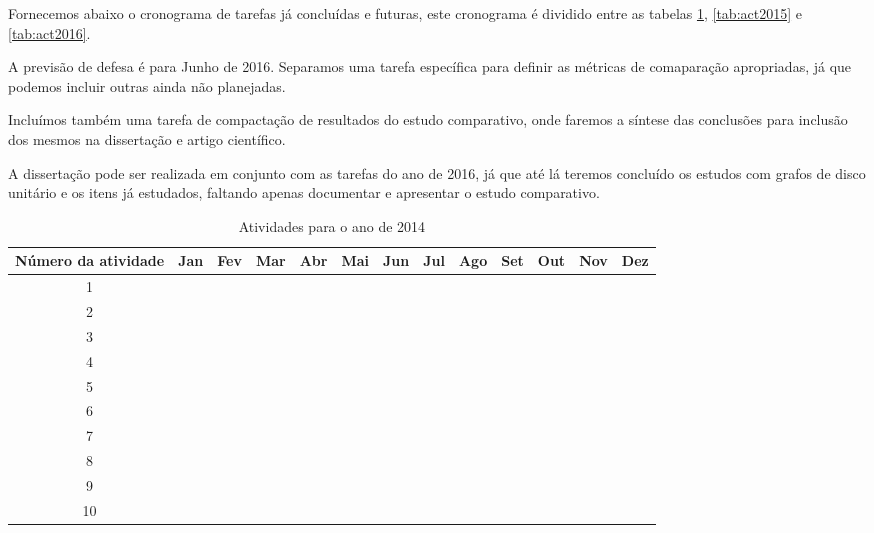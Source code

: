 Fornecemos abaixo o cronograma de tarefas já concluídas e futuras, este cronograma é dividido entre as tabelas \ref{tab:act2014}, \ref{tab:act2015} e \ref{tab:act2016}.

A previsão de defesa é para Junho de 2016. Separamos uma tarefa específica para definir as métricas de comaparação apropriadas, já que podemos incluir outras ainda não planejadas.

Incluímos também uma tarefa de compactação de resultados do estudo comparativo, onde faremos a síntese das conclusões para inclusão dos mesmos na dissertação e artigo científico.

A dissertação pode ser realizada em conjunto com as tarefas do ano de 2016, já que até lá teremos concluído os estudos com grafos de disco unitário e os itens já estudados, faltando apenas documentar e apresentar o estudo comparativo.

\begin{table}[]
\centering
\caption{Atividades para o ano de 2014}
\label{tab:act2014}
\begin{tabular}{|c|l|l|l|l|l|l|l|l|l|l|l|l|}
\hline
Número da atividade & Jan &  Fev & Mar & Abr & Mai & Jun & Jul & Ago & Set & Out & Nov & Dez \\ \hline
1& & \cellcolor[HTML]{343434}   & \cellcolor[HTML]{343434}  & \cellcolor[HTML]{343434} & \cellcolor[HTML]{343434}  & \cellcolor[HTML]{343434} & \cellcolor[HTML]{343434} &  \cellcolor[HTML]{343434} & \cellcolor[HTML]{343434} & \cellcolor[HTML]{343434} & \cellcolor[HTML]{343434} & \cellcolor[HTML]{343434}  \\ \hline
2& & \cellcolor[HTML]{343434}  & \cellcolor[HTML]{343434}   & \cellcolor[HTML]{343434}  & \cellcolor[HTML]{343434}  & \cellcolor[HTML]{343434}  & \cellcolor[HTML]{343434}  & \cellcolor[HTML]{343434}  & \cellcolor[HTML]{343434}  & \cellcolor[HTML]{343434}  & \cellcolor[HTML]{343434}  & \cellcolor[HTML]{343434}  \\ \hline
3& &  &  &  &  &  &  &  &  &  &  &  \\ \hline
4& &  &  &  &  &  &  &  &  &  &  &  \\ \hline
5& &  &  &  &  &  &  &  &  &  &  &  \\ \hline
6& &  &  &  &  &  &  &  &  &  &  &  \\ \hline
7& &  &  &  &  &  &  &  &  &  &  &  \\ \hline
8& &  &  &  &  &  &  &  &  &  &  &  \\ \hline
9& &  &  &  &  &  &  &  &  &  &  &  \\ \hline
10& &  &  &  &  &  &  &  &  &  &  &  \\ \hline
\end{tabular}
\end{table}

